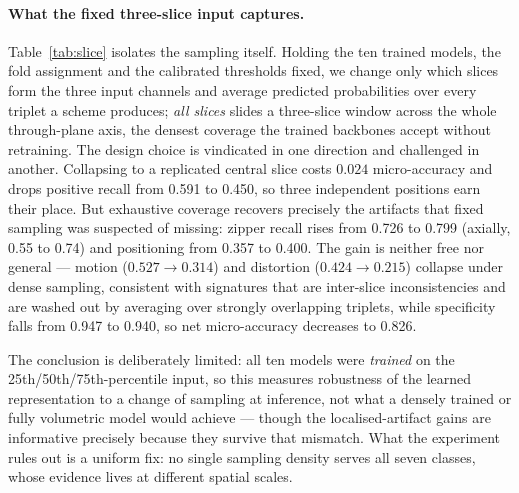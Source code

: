 \documentclass[runningheads]{llncs}
\begin{document}
\paragraph{What the fixed three-slice input captures.}
Table~\ref{tab:slice} isolates the sampling itself. Holding the ten trained models,
the fold assignment and the calibrated thresholds fixed, we change only which slices
form the three input channels and average predicted probabilities over every triplet a
scheme produces; \emph{all slices} slides a three-slice window across the whole
through-plane axis, the densest coverage the trained backbones accept without
retraining. The design choice is vindicated in one direction and challenged in
another. Collapsing to a replicated central slice costs $0.024$ micro-accuracy and
drops positive recall from 0.591 to 0.450, so three independent positions earn their
place. But exhaustive coverage recovers precisely the artifacts that fixed sampling
was suspected of missing: zipper recall rises from 0.726 to 0.799 (axially, 0.55 to
0.74) and positioning from 0.357 to 0.400. The gain is neither free nor general ---
motion ($0.527\!\to\!0.314$) and distortion ($0.424\!\to\!0.215$) collapse under dense
sampling, consistent with signatures that are inter-slice inconsistencies and are
washed out by averaging over strongly overlapping triplets, while specificity falls
from 0.947 to 0.940, so net micro-accuracy decreases to 0.826.

The conclusion is deliberately limited: all ten models were \emph{trained} on the
25th/50th/75th-percentile input, so this measures robustness of the learned
representation to a change of sampling at inference, not what a densely trained or
fully volumetric model would achieve --- though the localised-artifact gains are
informative precisely because they survive that mismatch. What the experiment rules
out is a uniform fix: no single sampling density serves all seven classes, whose
evidence lives at different spatial scales.
\end{document}
